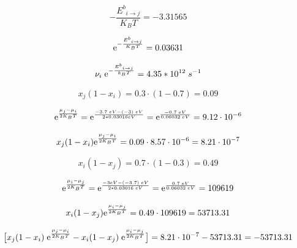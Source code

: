 \documentclass{article}
\begin{document}
\begin{equation}\nonumber
    -\frac{{E^b}_{i\rightarrow j}}{K_BT}=-3.31565
\end{equation}

\begin{equation}\nonumber
    {\rm e}^{-\frac{{E^b}_{i\rightarrow j}}{K_BT}}=0.03631
\end{equation}

\begin{equation}\nonumber
    \nu_i  \;{\rm e}^{-\frac{{E^b}_{i\rightarrow j}}{k_BT}}=4.35*10^{12} \; s^{-1}
\end{equation}

\begin{equation}\nonumber
    x_j(1-x_i)=0.3·(1-0.7)=0.09
\end{equation}

\begin{equation} \nonumber
   {\rm e}^{\frac{\mu_j-\mu_i}{2K_BT}} = {\rm e}^{\frac{-3.7 \; eV- (- 3) \; eV}{2*0.03016eV}}={\rm e}^{\frac{-0.7 \; eV}{0.06032 \; eV}}=9.12 \cdot 10^{-6}
\end{equation}

\begin{equation} \nonumber
   x_j(1-x_i){\rm e}^{\frac{\mu_j-\mu_i}{2K_BT}} =0.09 \cdot 8.57 \cdot 10^{-6} = 8.21 \cdot 10^{-7}
\end{equation}

\begin{equation}\nonumber
    x_i(1-x_j)=0.7 \cdot (1-0.3)=0.49
\end{equation}

\begin{equation} \nonumber
   {\rm e}^{\frac{\mu_i-\mu_j}{2K_BT}} = {\rm e}^{\frac{-3eV- (- 3.7) \; eV}{2*0.03016 \; eV}}={\rm e}^{\frac{0.7 \; eV}{0.06032 \; eV}}=109619
\end{equation}

\begin{equation} \nonumber
   x_i(1-x_j) {\rm e}^{\frac{\mu_i-\mu_j}{2K_BT}} =0.49 \cdot 109619=53713.31
\end{equation}

\begin{equation}\nonumber
    \big[ x_j(1-x_i)\;{\rm e}^{\frac{\mu_j-\mu_i}{2K_BT}} - x_i(1-x_j)\;{\rm e}^{\frac{\mu_i-\mu_j}{2K_BT}} \big] = 8.21 \cdot 10^{-7} - 53713.31 = - 53713.31
\end{equation}
\end{document}
